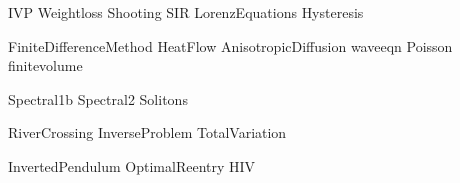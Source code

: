 \documentclass[nociteref]{SIAM-GH-book}
\begin{document}
{IVP}
{Weightloss}
{Shooting}
{SIR}
{LorenzEquations}
{Hysteresis}

{FiniteDifferenceMethod}
{HeatFlow}
{AnisotropicDiffusion}
{waveeqn}
{Poisson}
{finitevolume}



{Spectral1b}
{Spectral2}
{Solitons}

{RiverCrossing}
{InverseProblem}
{TotalVariation}

{InvertedPendulum}
{OptimalReentry}
{HIV}
\end{document}

